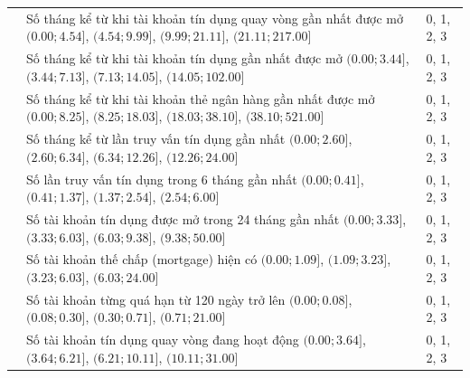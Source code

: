\begin{longtable}{V{2.6cm}D{9.0cm}S{3.0cm}}
     & Số tháng kể từ khi tài khoản tín dụng quay vòng gần nhất được mở \newline $(0.00; 4.54]$, $(4.54; 9.99]$, $(9.99; 21.11]$, $(21.11; 217.00]$ & 0, 1, 2, 3 \\
 
     & Số tháng kể từ khi tài khoản tín dụng gần nhất được mở \newline $(0.00; 3.44]$, $(3.44; 7.13]$, $(7.13; 14.05]$, $(14.05; 102.00]$ & 0, 1, 2, 3 \\
 
     & Số tháng kể từ khi tài khoản thẻ ngân hàng gần nhất được mở \newline $(0.00; 8.25]$, $(8.25; 18.03]$, $(18.03; 38.10]$, $(38.10; 521.00]$ & 0, 1, 2, 3 \\
 
     & Số tháng kể từ lần truy vấn tín dụng gần nhất \newline $(0.00; 2.60]$, $(2.60; 6.34]$, $(6.34; 12.26]$, $(12.26; 24.00]$ & 0, 1, 2, 3 \\
 
     & Số lần truy vấn tín dụng trong 6 tháng gần nhất \newline $(0.00; 0.41]$, $(0.41; 1.37]$, $(1.37; 2.54]$, $(2.54; 6.00]$ & 0, 1, 2, 3 \\
 
     & Số tài khoản tín dụng được mở trong 24 tháng gần nhất \newline $(0.00; 3.33]$, $(3.33; 6.03]$, $(6.03; 9.38]$, $(9.38; 50.00]$ & 0, 1, 2, 3 \\
 
     & Số tài khoản thế chấp (mortgage) hiện có \newline $(0.00; 1.09]$, $(1.09; 3.23]$, $(3.23; 6.03]$, $(6.03; 24.00]$ & 0, 1, 2, 3 \\
 
     & Số tài khoản từng quá hạn từ 120 ngày trở lên \newline $(0.00; 0.08]$, $(0.08; 0.30]$, $(0.30; 0.71]$, $(0.71; 21.00]$ & 0, 1, 2, 3 \\
 
     & Số tài khoản tín dụng quay vòng đang hoạt động \newline $(0.00; 3.64]$, $(3.64; 6.21]$, $(6.21; 10.11]$, $(10.11; 31.00]$ & 0, 1, 2, 3 \\
 

\end{longtable}
